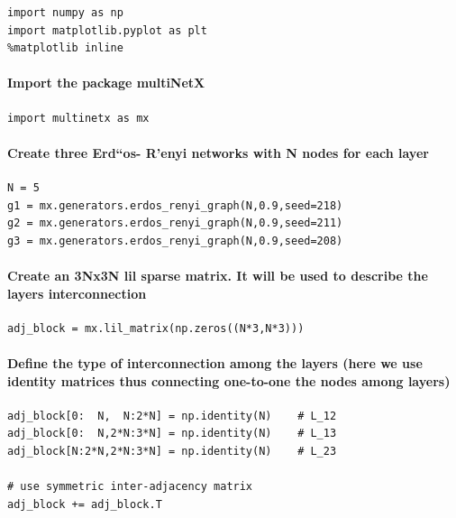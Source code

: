 \documentclass[]{article}
\begin{document}
\begin{verbatim}
import numpy as np
import matplotlib.pyplot as plt
%matplotlib inline
\end{verbatim}

\paragraph{Import the package
multiNetX}\label{import-the-package-multinetx}

\begin{verbatim}
import multinetx as mx
\end{verbatim}


\paragraph{Create three Erd``os- R'enyi networks with N nodes for each
layer}\label{create-three-erdos--renyi-networks-with-n-nodes-for-each-layer}

\begin{verbatim}
N = 5
g1 = mx.generators.erdos_renyi_graph(N,0.9,seed=218)
g2 = mx.generators.erdos_renyi_graph(N,0.9,seed=211)
g3 = mx.generators.erdos_renyi_graph(N,0.9,seed=208)
\end{verbatim}

\paragraph{Create an 3Nx3N lil sparse matrix. It will be used to
describe the layers
interconnection}\label{create-an-3nx3n-lil-sparse-matrix.-it-will-be-used-to-describe-the-layers-interconnection}

\begin{verbatim}
adj_block = mx.lil_matrix(np.zeros((N*3,N*3)))
\end{verbatim}

\paragraph{Define the type of interconnection among the layers (here we
use identity matrices thus connecting one-to-one the nodes among
layers)}\label{define-the-type-of-interconnection-among-the-layers-here-we-use-identity-matrices-thus-connecting-one-to-one-the-nodes-among-layers}

\begin{verbatim}
adj_block[0:  N,  N:2*N] = np.identity(N)    # L_12
adj_block[0:  N,2*N:3*N] = np.identity(N)    # L_13
adj_block[N:2*N,2*N:3*N] = np.identity(N)    # L_23

# use symmetric inter-adjacency matrix
adj_block += adj_block.T
\end{verbatim}
\end{document}
